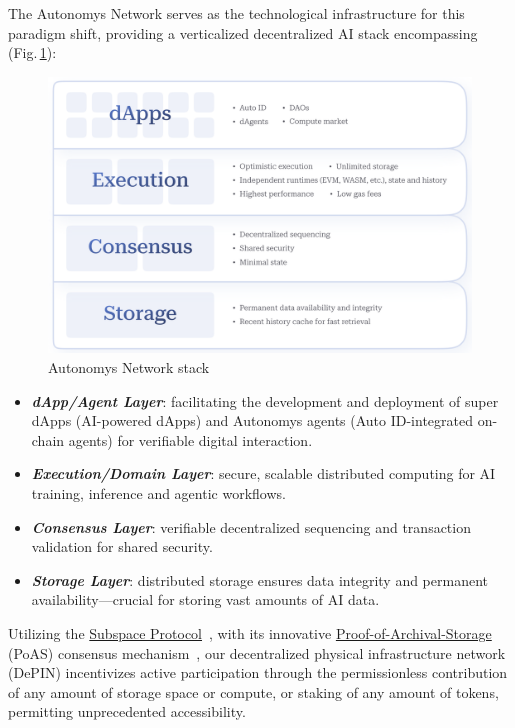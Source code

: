 \documentclass[conference]{IEEEtran}
\begin{document}
The Autonomys Network serves as the technological infrastructure for this paradigm shift, providing a verticalized decentralized AI stack encompassing (Fig.\,\ref{fig:stack}):
\begin{figure}
    \centering
    \includegraphics[width=1\linewidth]{ai30_stack.png}
 \caption{Autonomys Network stack}
 \label{fig:stack}
\end{figure}
\begin{itemize}
    \item \textit{\textbf{dApp/Agent Layer}}: facilitating the development and deployment of super dApps (AI-powered dApps) and Autonomys agents (Auto ID-integrated on-chain agents) for verifiable digital interaction. 
    \item \textit{\textbf{Execution/Domain Layer}}: secure, scalable distributed computing for AI training, inference and agentic workflows.
    \item \textit{\textbf{Consensus Layer}}: verifiable decentralized sequencing and transaction validation for shared security.
    \item \textit{\textbf{Storage Layer}}: distributed storage ensures data integrity and permanent availability—crucial for storing vast amounts of AI data.
\end{itemize}

Utilizing the \hyperref[sec:subspace]{Subspace Protocol}~\cite{subspacev1}, with its innovative \hyperref[sec:poas]{Proof-of-Archival-Storage} (PoAS) consensus mechanism~\cite{subspacev2}, our decentralized physical infrastructure network (DePIN) incentivizes active participation through the permissionless contribution of any amount of storage space or compute, or staking of any amount of tokens, permitting unprecedented accessibility.
\end{document}
